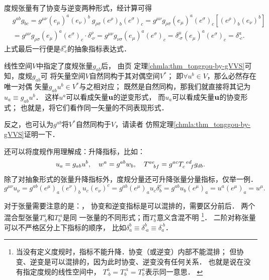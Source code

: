 度规张量有了协变与逆变两种形式，经计算可得
\begin{equation}
\begin{aligned}
    &g^{ab}g_{bc} = g^{\mu\nu} (e_\mu)^a (e_\nu)^b \ 
       g_{\rho\sigma} (e^\rho)_b (e^\sigma)_c
       =g^{\mu\nu}g_{\rho\sigma}(e_\mu)^a (e^\sigma)_c
       \left[(e^\rho)_b (e_\nu)^b \right] \\
    &= g^{\mu\nu}g_{\rho\sigma}(e_\mu)^a (e^\sigma)_c \cdot \delta^\rho _{\cdot \nu} 
     = g^{\mu\nu}g_{\nu\sigma}(e_\mu)^a (e^\sigma)_c 
    = \delta^\mu _{\cdot \sigma} (e_\mu)^a (e^\sigma)_c 
    = \delta^a_{\cdot c} .
\end{aligned}
\end{equation}
上式最后一行便是$\delta^a_{\cdot c}$的抽象指标表达式．

线性空间$V$中指定了度规张量$g_{ab}$后，
由\pageref{chmla:thm_tonggou-by-gVVS}页
定理\ref{chmla:thm_tonggou-by-gVVS}可知，度规$g_{ab}$可
将矢量空间$V${\kaishu 自然同构}于其对偶空间$V^*$；
即$\forall u^b \in V$，那么必然存在唯一对偶
矢量$g_{ab}u^b\in V^*$与之相对应；
既然是自然同构，那我们就直接将其记为$u_a \equiv g_{ab}u^b$．
这样$u^a$可以看成矢量$\bf u$的逆变形式，
而$u_a$可以看成矢量$\bf u$的协变形式；
也就是，将它们看作同一矢量的不同表现形式．

反之，也可认为$g^{ab}$将$V^*${\kaishu 自然同构}于$V$，请读者
仿照定理\ref{chmla:thm_tonggou-by-gVVS}证明一下．

还可以将度规作用理解成：升降指标，比如：
\begin{equation*}
    u_a =g_{ab}u^b, \quad w^a=g^{ab}w_b, \quad
    T^{ae}_{\hphantom{ae} bf}=g^{ac}T^{\hphantom{c} ed}_{c \hphantom{ed} f}g_{db} .
\end{equation*}
除了对抽象形式的张量升降指标外，度规分量还可升降张量分量指标，仅举一例．
\begin{equation*}
    g^{\mu\nu} u_\nu = g^{ab} (e^\mu)_a (e^\nu)_b \ u_c (e_\nu)^c
    =g^{ab} (e^\mu)_a  u_c \delta^c_b
    =g^{ab} u_b (e^\mu)_a  = u^a(e^\mu)_a = u^\mu .
\end{equation*}


对于张量需要注意的是：{\kaishu{}}，
协变和逆变指标是{\heiti{}}可以混排的，需要区分前后．
两个混合型张量$T^{a}_{\cdot b}$和$T^{\cdot a}_{b}$是同
一张量的不同形式；而$T^{a}_{b}$意义含混不明
{\footnote{当没有定义度规时，指标不能升降．协变（或逆变）内部不能混排；
        但协变、逆变是可以混排的，因为此时协变、逆变没有任何关系．
        也就是说在没有指定度规的线性空间中，
        $T^{a}_{\cdot b}=T^{\cdot a}_{b}=T^{a}_{b}$表示同一意思．
        \label{chdm:ft_index}}}．
二阶{\kaishu 对称}张量可以不严格区分上下指标的顺序，
比如$\delta_{a}^{b}\equiv \delta_{\cdot a}^{b}\equiv \delta_{a}^{\cdot b}$．

